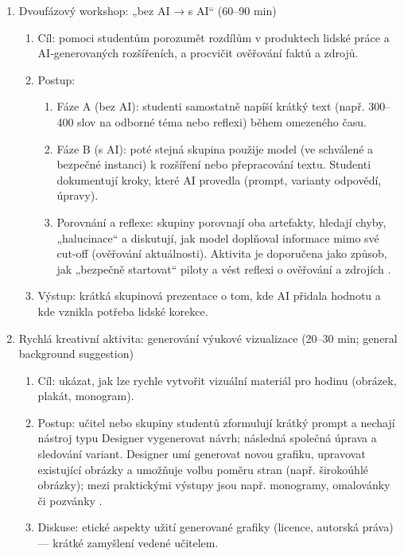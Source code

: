 \documentclass{report}%
\begin{document}
\begin{enumerate}
  \item Dvoufázový workshop: „bez AI → s AI“ (60–90 min)
    \begin{enumerate}
      \item Cíl: pomoci studentům porozumět rozdílům v produktech lidské práce a AI‑generovaných rozšířeních, a procvičit ověřování faktů a zdrojů.
      \item Postup:
        \begin{enumerate}
          \item Fáze A (bez AI): studenti samostatně napíší krátký text (např. 300–400 slov na odborné téma nebo reflexi) během omezeného času.
          \item Fáze B (s AI): poté stejná skupina použije model (ve schválené a bezpečné instanci) k rozšíření nebo přepracování textu. Studenti dokumentují kroky, které AI provedla (prompt, varianty odpovědí, úpravy).
          \item Porovnání a reflexe: skupiny porovnají oba artefakty, hledají chyby, „halucinace“ a diskutují, jak model doplňoval informace mimo své cut‑off (ověřování aktuálnosti). Aktivita je doporučena jako způsob, jak „bezpečně startovat“ piloty a vést reflexi o ověřování a zdrojích \cite{kb_malinka_chatgpt_ve_vyuce_dva_roky_pote_2024_pdf_90bc3aaf_page_12_1, kb_ai_101_tipu_pdf_04e4a115_page_15_2}.
        \end{enumerate}
      \item Výstup: krátká skupinová prezentace o tom, kde AI přidala hodnotu a kde vznikla potřeba lidské korekce.
    \end{enumerate}

  \item Rychlá kreativní aktivita: generování výukové vizualizace (20–30 min; general background suggestion)
    \begin{enumerate}
      \item Cíl: ukázat, jak lze rychle vytvořit vizuální materiál pro hodinu (obrázek, plakát, monogram).
      \item Postup: učitel nebo skupiny studentů zformulují krátký prompt a nechají nástroj typu Designer vygenerovat návrh; následná společná úprava a sledování variant. Designer umí generovat novou grafiku, upravovat existující obrázky a umožňuje volbu poměru stran (např. širokoúhlé obrázky); mezi praktickými výstupy jsou např. monogramy, omalovánky či pozvánky \cite{kb_ai_101_tipu_pdf_04e4a115_page_51_1}.
      \item Diskuse: etické aspekty užití generované grafiky (licence, autorská práva) — krátké zamyšlení vedené učitelem.
    \end{enumerate}


\end{enumerate}
\end{document}
